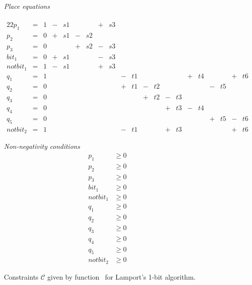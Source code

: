 \begin{figure}
  \begin{minipage}{.79\columnwidth}
    \emph{Place equations} \\ \\[-2em]
    \begin{alignat*}{22}
         p_1   &{}={}& 1 &{}-{}& s1 &     &    &{}+{}& s3 &&&&&&&&&&&&& \\[-0.1cm]
         p_2   &{}={}& 0 &{}+{}& s1 &{}-{}& s2 &     &    &&&&&&&&&&&&& \\[-0.1cm]
         p_3   &{}={}& 0 &     &    &{}+{}& s2 &{}-{}& s3 &&&&&&&&&&&&& \\[-0.1cm]
         bit_1 &{}={}& 0 &{}+{}& s1 &     &    &{}-{}& s3 &&&&&&&&&&&&& \\[-0.1cm]
      notbit_1 &{}={}& 1 &{}-{}& s1 &     &    &{}+{}& s3 &&&&&&&&&&&&& \\[-0.1cm]
         q_1   &{}={}& 1 &&&&&&&{}-{}& t1 &     &    &     &    &{}+{}& t4 &     &    &{}+{}& t6 & \\[-0.1cm]
         q_2   &{}={}& 0 &&&&&&&{}+{}& t1 &{}-{}& t2 &     &    &     &    &{}-{}& t5 &     &    & \\[-0.1cm]
         q_3   &{}={}& 0 &&&&&&&     &    &{}+{}& t2 &{}-{}& t3 &     &    &     &    &     &    & \\[-0.1cm]
         q_4   &{}={}& 0 &&&&&&&     &    &     &    &{}+{}& t3 &{}-{}& t4 &     &    &     &    & \\[-0.1cm]
         q_5   &{}={}& 0 &&&&&&&     &    &     &    &     &    &     &    &{}+{}& t5 &{}-{}& t6 & \\[-0.1cm]
    notbit_2 &{}={}& 1 &&&&&&&{}-{}& t1 &     &    &{}+{}& t3 &     &    &     &    &{}+{}& t6 &
    \end{alignat*}
  \end{minipage}
  \begin{minipage}{.19\columnwidth}
    \emph{Non-negativity conditions} \\[-2em]
    \begin{align*}
         p_1   & \ge 0 \\[-0.1cm]
         p_2   & \ge 0 \\[-0.1cm]
         p_3   & \ge 0 \\[-0.1cm]
         bit_1 & \ge 0 \\[-0.1cm]
      notbit_1 & \ge 0 \\[-0.1cm]
         q_1   & \ge 0 \\[-0.1cm]
         q_2   & \ge 0 \\[-0.1cm]
         q_3   & \ge 0 \\[-0.1cm]
         q_4   & \ge 0 \\[-0.1cm]
         q_5   & \ge 0 \\[-0.1cm]
      notbit_2 & \ge 0
    \end{align*}
  \end{minipage}
  \caption{Constraints $\mathcal{C}$ given by function \safety\ for
      Lamport's 1-bit algorithm.}
\label{fig:setC}
\end{figure}
